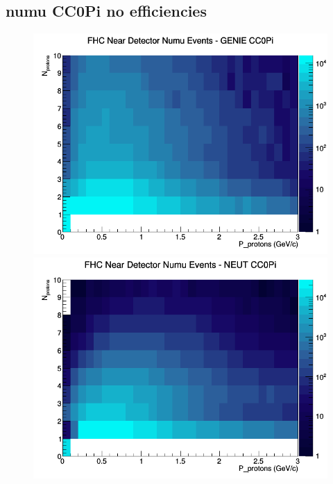 \subsection{numu CC0Pi no efficiencies}
\begin{figure}[h]
\includegraphics[width=\linewidth]{N_P/nominal/protons/CC0Pi_FHC_ND_numu_N_P_GENIE.png}
\endminipage
{}
\includegraphics[width=\linewidth]{N_P/nominal/protons/CC0Pi_FHC_ND_numu_N_P_NEUT.png}
\endminipage
{}

\end{figure}
